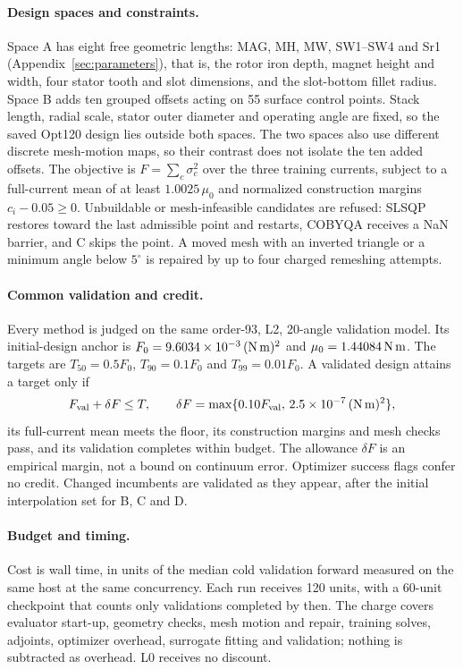\paragraph{Design spaces and constraints.}
Space A has eight free geometric lengths: MAG, MH, MW, SW1--SW4 and Sr1
(Appendix~\ref{sec:parameters}), that is, the rotor iron depth, magnet
height and width, four stator tooth and slot dimensions, and the slot-bottom
fillet radius. Space B adds ten grouped
offsets acting on 55 surface control points. Stack length, radial scale,
stator outer diameter and operating angle are fixed, so the saved Opt120
design lies outside both spaces. The two spaces also use different discrete
mesh-motion maps, so their contrast does not isolate the ten added offsets.
The objective is $F=\sum_c\sigma_c^2$ over the three training currents,
subject to a full-current mean of at least $1.0025\,\mu_0$ and normalized
construction margins $c_i-0.05\geq0$. Unbuildable or mesh-infeasible
candidates are refused: SLSQP restores toward the last admissible point and
restarts, COBYQA receives a NaN barrier, and C skips the point. A moved mesh
with an inverted triangle or a minimum angle below $5^\circ$ is repaired by
up to four charged remeshing attempts.

\paragraph{Common validation and credit.}
Every method is judged on the same order-93, L2, 20-angle validation model.
Its initial-design anchor is $F_0=9.6034\times10^{-3}\,(\mathrm{N\,m})^2$ and
$\mu_0=1.44084\,\mathrm{N\,m}$. The targets are $T_{50}=0.5F_0$, $T_{90}=0.1F_0$ and
$T_{99}=0.01F_0$. A validated design attains a target only if
\begin{equation}
 F_{\mathrm{val}}+\delta F\leq T,\qquad
 \delta F=\max\{0.10F_{\mathrm{val}},\,2.5\times10^{-7}\,(\mathrm{N\,m})^2\},
\end{equation}
its full-current mean meets the floor, its construction margins and mesh
checks pass, and its validation completes within budget. The allowance
$\delta F$ is an empirical margin, not a bound on continuum error. Optimizer
success flags confer no credit. Changed incumbents are validated as they
appear, after the initial interpolation set for B, C and D.

\paragraph{Budget and timing.}
Cost is wall time, in units of the median cold validation forward measured
on the same host at the same concurrency. Each run receives 120 units,
with a 60-unit checkpoint that counts only validations completed by then.
The charge covers evaluator start-up, geometry checks, mesh motion and
repair, training solves, adjoints, optimizer overhead, surrogate fitting
and validation; nothing is subtracted as overhead. L0 receives no discount.

